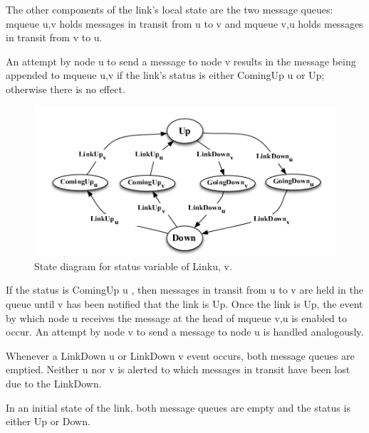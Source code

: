The other components of the link’s local state are the two message queues: mqueue u,v holds messages in transit from u to v and mqueue v,u holds messages in transit from v to u.

An attempt by node u to send a message to node v results in the message being appended to mqueue u,v if the link’s status is either ComingUp u or Up; otherwise there is no effect.

\begin{figure}[hbtp]
\centering
\includegraphics[scale=.75]{screenshot_1.png}
\caption{State diagram for status variable of Link\lbrace u, v\rbrace .}
\end{figure}

If the status is ComingUp u , then messages in transit from u to v are held in the queue until v has been notified that the link is Up. Once the link is Up, the event by which node u receives the message at the head of mqueue v,u is enabled to occur. An attempt by node v to send a message to node u is handled analogously.

Whenever a LinkDown u or LinkDown v event occurs, both message queues are emptied. Neither u nor v is alerted to which messages in transit have been lost due to the LinkDown.

In an initial state of the link, both message queues are empty and the status is either Up or Down.

